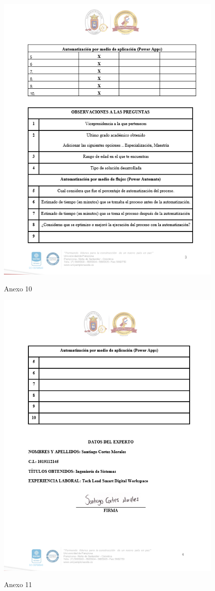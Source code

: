 \begin{figure}[H]
	\centering
	\includegraphics[scale=0.4]{Capitulo6/10}
	\label{anexo10}
	\caption{Anexo 10}
\end{figure}

\begin{figure}[H]
	\centering
	\includegraphics[scale=0.4]{Capitulo6/11}
	\label{anexo11}
	\caption{Anexo 11}
\end{figure}

